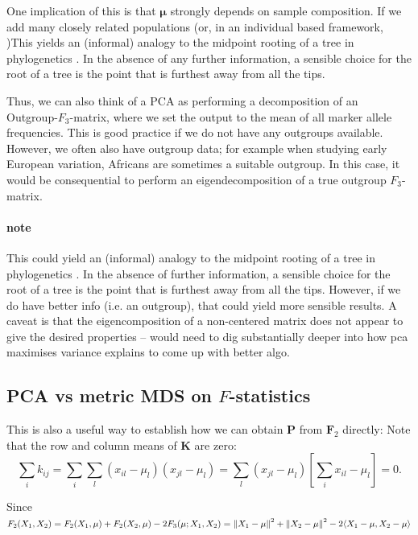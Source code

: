 \documentclass[10pt,a4paper]{article}
\newcommand{\normsq}[1]{\left\lVert#1\right\rVert^2}
\newcommand{\MF}{\mathbf{F}_2} %
\newcommand{\MP}{\mathbf{P}} %
\newcommand{\MK}{\mathbf{K}} %
\newcommand{\MEAN}{\boldsymbol{\mu}} %
\begin{document}
	One implication of this is that $\MEAN$ strongly depends on sample composition. If we add many closely related populations (or, in an individual based framework, )This yields an (informal) analogy to the midpoint rooting of a tree in phylogenetics \citep[see e.g.][]{felsenstein2004}. In the absence of any further information, a sensible choice for the root of a tree is the point that is furthest away from all the tips.
	
	
	
	Thus, we can also think of a PCA as performing a decomposition of an Outgroup-$F_3$-matrix, where we set the output to the mean of all marker allele frequencies. This is good practice if we do not have any outgroups available. However, we often also have outgroup data; for example when studying early European variation, Africans are sometimes a suitable outgroup. In this case, it would be consequential to perform an eigendecomposition of a true outgroup $F_3$-matrix.
	
	\paragraph{note}
	This could yield an (informal) analogy to the midpoint rooting of a tree in phylogenetics \citep[see e.g.][]{felsenstein2004}. In the absence of further information, a sensible choice for the root of a tree is the point that is furthest away from all the tips. However,  if we do have better info (i.e. an outgroup), that could yield more sensible results. A caveat is that the eigencomposition of a non-centered matrix does not appear to give the desired properties -- would need to dig substantially deeper into how pca maximises variance explains to come up with better algo.

\subsection{PCA vs metric MDS on $F$-statistics}	
	
This is also a useful way to establish how we can obtain $\MP$ from $\MF$ directly: Note that the row and column means of $\MK$ are zero:
\begin{equation*}
\sum_i k_{ij}= \sum_i\sum_l (x_{il}-\mu_l)(x_{jl} - \mu_l)= \sum_l(x_{jl} - \mu_l)\left[\sum_i x_{il} -\mu_l\right] = 0 \text{.}
\end{equation*}

Since $F_2(X_1, X_2) = F_2(X_1, \mu) + F_2(X_2, \mu) - 2 F_3(\mu; X_1, X_2) \\= \normsq{X_1-\mu} + \normsq{X_2 - \mu} - 2\langle X_1 - \mu, X_2 - \mu \rangle$
\end{document}
